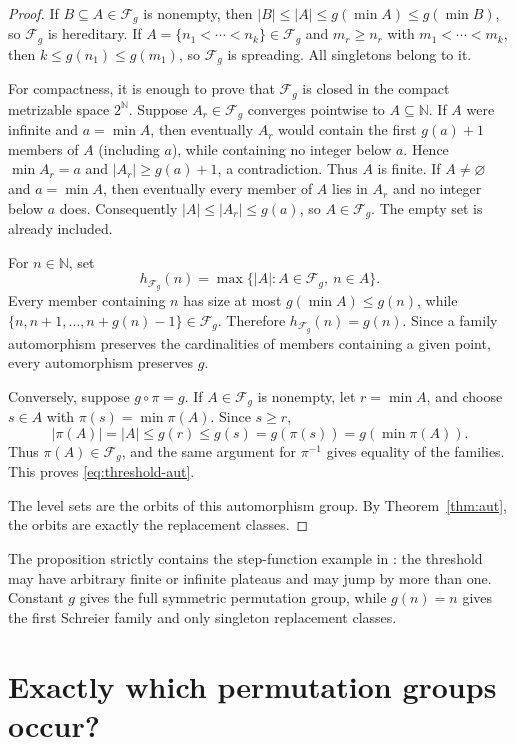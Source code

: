 \documentclass[11pt]{article}
\theoremstyle{definition}
\theoremstyle{remark}
\newcommand{\N}{\mathbb N}
\newcommand{\F}{\mathcal F}
\begin{document}
\begin{proof}
If $B\subseteq A\in\F_g$ is nonempty, then
$|B|\le |A|\le g(\min A)\le g(\min B)$, so $\F_g$ is hereditary.  If
$A=\{n_1<\cdots<n_k\}\in\F_g$ and $m_r\ge n_r$ with
$m_1<\cdots<m_k$, then $k\le g(n_1)\le g(m_1)$, so $\F_g$ is spreading.
All singletons belong to it.

For compactness, it is enough to prove that $\F_g$ is closed in the compact
metrizable space $2^{\N}$.  Suppose $A_r\in\F_g$ converges pointwise to
$A\subseteq\N$.  If $A$ were infinite and $a=\min A$, then eventually $A_r$
would contain the first $g(a)+1$ members of $A$ (including $a$), while
containing no integer below $a$.  Hence $\min A_r=a$ and $|A_r|\ge g(a)+1$, a
contradiction.  Thus $A$ is finite.  If $A\ne\varnothing$ and $a=\min A$,
then eventually every member of $A$ lies in $A_r$ and no integer below $a$
does.  Consequently
$|A|\le |A_r|\le g(a)$, so $A\in\F_g$.  The empty set is already included.

For $n\in\N$, set
\[
  h_{\F_g}(n)=\max\{|A|:A\in\F_g,\ n\in A\}.
\]
Every member containing $n$ has size at most
$g(\min A)\le g(n)$, while
$\{n,n+1,\ldots,n+g(n)-1\}\in\F_g$.  Therefore
$h_{\F_g}(n)=g(n)$.  Since a family automorphism preserves the cardinalities
of members containing a given point, every automorphism preserves $g$.

Conversely, suppose $g\circ\pi=g$.  If $A\in\F_g$ is nonempty, let
$r=\min A$, and choose $s\in A$ with $\pi(s)=\min\pi(A)$.  Since $s\ge r$,
\[
  |\pi(A)|=|A|\le g(r)\le g(s)=g(\pi(s))=g(\min\pi(A)).
\]
Thus $\pi(A)\in\F_g$, and the same argument for $\pi^{-1}$ gives equality of
the families.  This proves \eqref{eq:threshold-aut}.

The level sets are the orbits of this automorphism group.  By
Theorem~\ref{thm:aut}, the orbits are exactly the replacement classes.
\end{proof}

The proposition strictly contains the step-function example in
\cite[Example~18]{BFT}: the threshold may have arbitrary finite or infinite
plateaus and may jump by more than one.  Constant $g$ gives the full symmetric
permutation group, while $g(n)=n$ gives the first Schreier family and only
singleton replacement classes.

\section{Exactly which permutation groups occur?}
\end{document}
